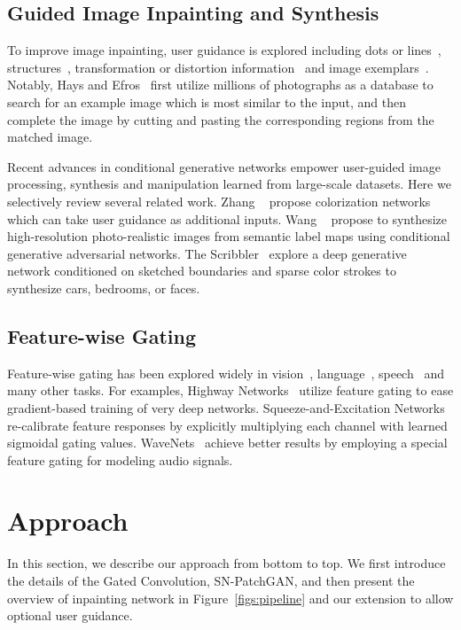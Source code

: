 \documentclass[10pt,twocolumn,letterpaper]{article}
\begin{document}
\subsection{Guided Image Inpainting and Synthesis}
To improve image inpainting, user guidance is explored including dots or lines~\cite{ashikhmin2001synthesizing, barnes2009patchmatch, drori2003fragment, sun2005image}, structures~\cite{huang2014image}, transformation or distortion information~\cite{huang2013transformation, pavic2006interactive} and image exemplars~\cite{criminisi2004region, hays2007scene, kwatra2005texture, whyte2009get, zhao2019guided}. Notably, Hays and Efros~\cite{hays2007scene} first utilize millions of photographs as a database to search for an example image which is most similar to the input, and then complete the image by cutting and pasting the corresponding regions from the matched image.

Recent advances in conditional generative networks empower user-guided image processing, synthesis and manipulation learned from large-scale datasets. Here we selectively review several related work. Zhang \etal~\cite{zhang2017real} propose colorization networks which can take user guidance as additional inputs. Wang \etal~\cite{wang2018high} propose to synthesize high-resolution photo-realistic images from semantic label maps using conditional generative adversarial networks. The Scribbler~\cite{sangkloy2017scribbler} explore a deep generative network conditioned on sketched boundaries and sparse color strokes to synthesize cars, bedrooms, or faces.

\subsection{Feature-wise Gating}
Feature-wise gating has been explored widely in vision~\cite{hu2018squeeze, oord2016conditional, srivastava2015highway, wang2017gated}, language~\cite{dauphin2017language}, speech~\cite{oord2016wavenet} and many other tasks. For examples, Highway Networks~\cite{srivastava2015highway} utilize feature gating to ease gradient-based training of very deep networks. Squeeze-and-Excitation Networks re-calibrate feature responses by explicitly multiplying each channel with learned sigmoidal gating values. WaveNets~\cite{oord2016wavenet} achieve better results by employing a special feature gating  for modeling audio signals. 
\section{Approach}
In this section, we describe our approach from bottom to top. We first introduce the details of the Gated Convolution, SN-PatchGAN, and then present the overview of inpainting network in Figure~\ref{figs:pipeline} and our extension to allow optional user guidance.
\end{document}
